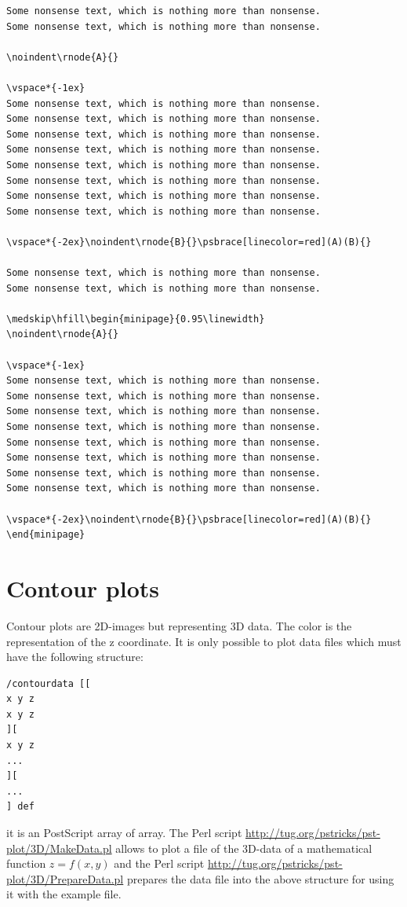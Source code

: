 \documentclass[11pt,english,BCOR=10mm,DIV=12,bibliography=totoc,parskip=false,headings=small,
    headinclude=false,footinclude=false,oneside]{pst-doc}
\begin{document}
\begin{lstlisting}
Some nonsense text, which is nothing more than nonsense.
Some nonsense text, which is nothing more than nonsense.

\noindent\rnode{A}{}

\vspace*{-1ex}
Some nonsense text, which is nothing more than nonsense.
Some nonsense text, which is nothing more than nonsense.
Some nonsense text, which is nothing more than nonsense.
Some nonsense text, which is nothing more than nonsense.
Some nonsense text, which is nothing more than nonsense.
Some nonsense text, which is nothing more than nonsense.
Some nonsense text, which is nothing more than nonsense.
Some nonsense text, which is nothing more than nonsense.

\vspace*{-2ex}\noindent\rnode{B}{}\psbrace[linecolor=red](A)(B){}

Some nonsense text, which is nothing more than nonsense.
Some nonsense text, which is nothing more than nonsense.

\medskip\hfill\begin{minipage}{0.95\linewidth}
\noindent\rnode{A}{}

\vspace*{-1ex}
Some nonsense text, which is nothing more than nonsense.
Some nonsense text, which is nothing more than nonsense.
Some nonsense text, which is nothing more than nonsense.
Some nonsense text, which is nothing more than nonsense.
Some nonsense text, which is nothing more than nonsense.
Some nonsense text, which is nothing more than nonsense.
Some nonsense text, which is nothing more than nonsense.
Some nonsense text, which is nothing more than nonsense.

\vspace*{-2ex}\noindent\rnode{B}{}\psbrace[linecolor=red](A)(B){}
\end{minipage}
\end{lstlisting}

\clearpage


\section{Contour plots}
Contour plots are 2D-images but representing 3D data. The color is the representation of
the z coordinate.
It is only possible to plot data files which must have the following
structure:
\begin{verbatim}
/contourdata [[
x y z
x y z
][
x y z
...
][
... 
] def
\end{verbatim} 
it is an PostScript array of array. The Perl script \url{http://tug.org/pstricks/pst-plot/3D/MakeData.pl} 
allows to plot a file of the 3D-data of a mathematical function $z=f(x,y)$ and the Perl script
\url{http://tug.org/pstricks/pst-plot/3D/PrepareData.pl} prepares the data file
into the above structure for using it with the example file. 
\end{document}
